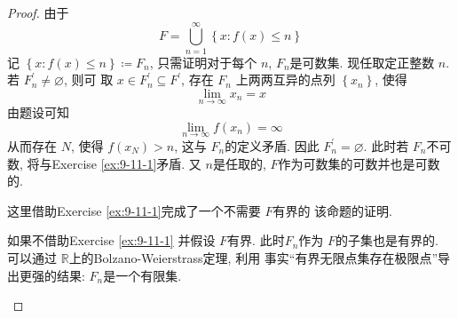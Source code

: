 \documentclass[../main.tex]{subfiles}
\begin{document}
\begin{proof}
    由于 \[
    F=  \bigcup _{n = 1}^{\infty}\left\{ x:f\left( x \right)\le n  \right\}
    \]记 \(  \left\{ x:f\left( x \right)\le n  \right\}\coloneqq  F_{n}  \), 只需证明对于每个 \(  n  \),  \(  F _{n} \)是可数集.
    现任取定正整数 \(  n  \).   若 \(  F_{n}^{\prime} \neq \varnothing  \), 则可 取 \(  x \in F_{n}^{\prime}   \subseteq F^{\prime} \), 存在 \(  F_{n}  \) 上两两互异的点列 \(  \left\{ x_{n} \right\}  \), 使得 \[
    \lim_{n\to \infty}x_{n}= x
    \] 由题设可知 \[
    \lim_{n\to \infty}f\left( x_{n} \right)= \infty 
    \]从而存在 \(  N  \), 使得 \(  f\left( x_{N} \right)>  n  \), 这与 \(  F_{n}  \)的定义矛盾.    因此 \(  F^{\prime}_{n} = \varnothing \).  此时若 \(  F_{n}  \)不可数, 将与Exercise \ref{ex:9-11-1}矛盾. 又 \(  n  \)是任取的,  \(  F  \)作为可数集的可数并也是可数的.
    
    \begin{remark}
        这里借助Exercise \ref{ex:9-11-1}完成了一个不需要 \(  F  \)有界的 该命题的证明.
        
        如果不借助Exercise \ref{ex:9-11-1} 并假设 \(  F  \)有界. 此时\(  F_{n}  \)作为 \(  F  \)的子集也是有界的.   可以通过 \(  \mathbb{R}   \)上的Bolzano-Weierstrass定理, 利用 事实``有界无限点集存在极限点''导出更强的结果: \(  F_{n}  \)是一个有限集.
    \end{remark}
\end{proof}
\end{document}
